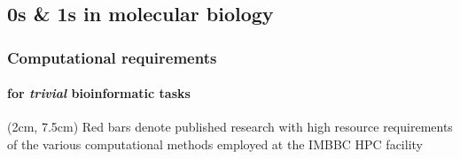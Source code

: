 \documentclass{beamer}
\begin{document}


   \begin{darkframes}
      \section{0s \& 1s in molecular biology}
   \end{darkframes}

   \begin{frame}

      \frametitle{Computational requirements}
      \framesubtitle{for \textit{trivial} bioinformatic tasks}


      \begin{textblock*}{10cm}(2cm, 7.5cm)
            \scriptsize Red bars denote published research with high resource requirements \\
            \scriptsize of the various computational methods employed at the IMBBC HPC facility
      \end{textblock*}


   \end{frame}
\end{document}
